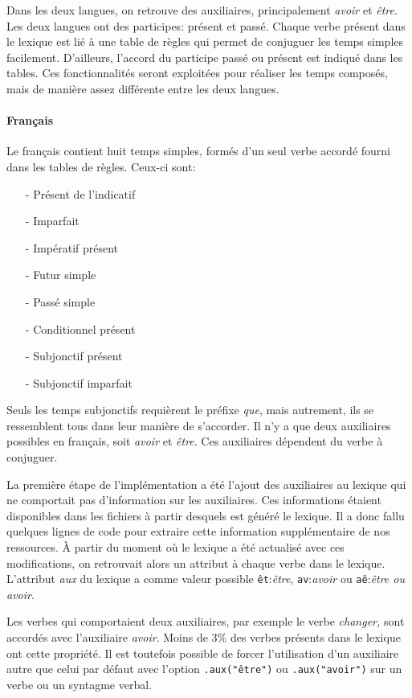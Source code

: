\documentclass[11pt]{article} %
\begin{document}
Dans les deux langues, on retrouve des auxiliaires, principalement 
\emph{avoir} et \emph{être}. Les deux langues ont des participes: 
présent et passé. Chaque verbe présent dans le lexique est 
lié à une table de règles qui 
permet de conjuguer les temps simples facilement. D'ailleurs, l'accord 
du participe passé ou présent est indiqué dans les tables. Ces fonctionnalités 
seront exploitées pour réaliser les temps composés, mais de manière assez 
différente entre les deux langues.

\paragraph{Français}

Le français contient huit temps simples, formés d'un seul verbe accordé fourni
dans les tables de règles. Ceux-ci sont:
\begin{itemize}
\item[-] Présent de l'indicatif
\item[-] Imparfait
\item[-] Impératif présent
\item[-] Futur simple
\item[-] Passé simple
\item[-] Conditionnel présent
\item[-] Subjonctif présent
\item[-] Subjonctif imparfait
\end{itemize}
Seuls les temps subjonctifs requièrent le préfixe \emph{que}, 
mais autrement, ils se ressemblent tous dans leur manière de s'accorder. Il n'y 
a que deux auxiliaires possibles en français, soit \emph{avoir} et \emph{être}.
Ces auxiliaires dépendent du verbe à conjuguer.

La première étape de l'implémentation
a été l'ajout des auxiliaires au lexique qui ne comportait pas
d'information sur les auxiliaires. Ces informations
étaient disponibles dans les fichiers à partir desquels est généré
le lexique. Il a donc fallu quelques lignes de code pour extraire
cette information supplémentaire de nos ressources. À partir du moment
où le lexique a été actualisé avec ces modifications, on retrouvait
alors un attribut à chaque verbe dans le lexique. L'attribut \emph{aux
}du lexique a comme valeur possible \texttt{êt}:\emph{être}, \texttt{av}:\emph{avoir}
ou \texttt{aê}:\emph{être ou avoir}.

Les verbes qui comportaient
deux auxiliaires, par exemple le verbe \emph{changer,} sont accordés
avec l'auxiliaire \emph{avoir}. Moins de 3\% des verbes présents dans le
lexique ont cette propriété. Il est toutefois possible de forcer l'utilisation 
d'un auxiliaire autre que celui par défaut
avec l'option \texttt{.aux("être")} ou \texttt{.aux("avoir")} sur un verbe ou un syntagme verbal.
\end{document}
